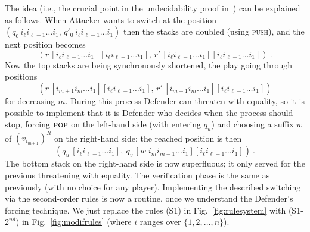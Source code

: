 \documentclass[11pt]{article}
\newcommand{\push}{\textsc{push}\xspace}
\newcommand{\pop}{\textsc{pop}\xspace}
\begin{document}
The idea (i.e., the crucial point in the undecidability proof 
in~\cite{DBLP:conf/fsttcs/BroadbentG12}) can be explained as follows.
When Attacker wants to switch at the position
$(q_0\, {i_\ell} {i_{\ell-1}}\dots {i_{1}},
\,q'_0\, {i_\ell} {i_{\ell-1}}\dots {i_{1}})$
then the stacks are doubled (using \push),
and the next position becomes
\begin{equation}\label{eq:doubled}
(r\, [{i_\ell} {i_{\ell-1}}\dots {i_{1}}][{i_\ell} {i_{\ell-1}}\dots {i_{1}}],
\,r'\, [{i_\ell} {i_{\ell-1}}\dots {i_{1}}][{i_\ell} {i_{\ell-1}}\dots
{i_{1}}])\ .
\end{equation}
Now the top stacks are being synchronously shortened, the play 
going through positions
$$(r\, [{i_{m+1}} {i_{m}}\dots {i_{1}}][{i_\ell} {i_{\ell-1}}\dots {i_{1}}],
\,r'\, [{i_{m+1}} {i_{m}}\dots {i_{1}}][{i_\ell} {i_{\ell-1}}\dots
{i_{1}}])$$
for decreasing $m$.
During this process
Defender can threaten with equality, so it is
possible to implement that it is Defender who decides when the process should
stop, forcing 
$\pop$ on the left-hand side (with entering $q_u$)
and choosing a suffix $w$ of $(v_{i_{m+1}})^R$ on the 
right-hand side; the reached position is then
\begin{equation} \label{eq:check}
(q_u\, [{i_\ell} {i_{\ell-1}}\dots {i_{1}}],
\ q_v\, [w\;{i_{m}}i_{m-1}\dots {i_{1}}][{i_\ell} {i_{\ell-1}}\dots
{i_{1}}]) \ . 
\end{equation}
The bottom stack on the right-hand side is now superfluous;
it only served for the previous threatening
with equality.
The verification phase is the same as previously
(with no choice for any player).
Implementing the described switching via the second-order rules 
is now a routine,
once we understand the Defender's forcing technique.
We just replace the rules (S1) in Fig.~\ref{fig:rulesystem}
with (S1-$2^{nd}$) in Fig.~\ref{fig:modifrules}
(where $i$ ranges over $\{1,2,\dots,n\}$).
\end{document}
